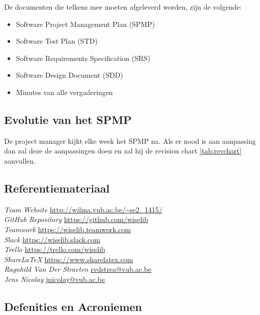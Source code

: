 De documenten die telkens mee moeten afgeleverd worden, zijn de volgende:

\begin{itemize}
\item Software Project Management Plan (SPMP)
\item Software Test Plan (STD)
\item Software Requirements Specification (SRS)
\item Software Design Document (SDD)
\item Minutes van alle vergaderingen
\end{itemize}

\subsection{Evolutie van het SPMP}

De project manager kijkt elke week het SPMP na. Als er nood is aan aanpassing dan zal deze de aanpassingen doen en zal hij de revision chart \ref{tab:revchart} aanvullen.

\subsection{Referentiemateriaal}

\begin{thebibliography}{9}
 \emph{Team Website} \url{http://wilma.vub.ac.be/~se2_1415/} \\
 \emph{GitHub Repository} \url{https://github.com/wiselib} \\
 \emph{Teamwork} \url{https://wiselib.teamwork.com} \\
 \emph{Slack} \url{https://wiselib.slack.com} \\
 \emph{Trello} \url{https://trello.com/wiselib} \\
 \emph{ShareLaTeX} \url{https://www.sharelatex.com} \\
 \emph{Ragnhild Van Der Straeten} \href{mailto:rvdstrea@vub.ac.be}{rvdstrea@vub.ac.be} \\
 \emph{Jens Nicolay} \href{mailto:jnicolay@vub.ac.be}{jnicolay@vub.ac.be} 
\end{thebibliography}

\subsection{Defenities en Acroniemen}

